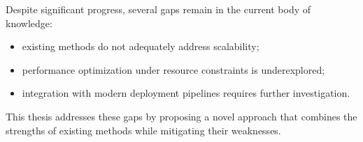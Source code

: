 Despite significant progress, several gaps remain in the current body of knowledge:
\begin{itemize}
  \item existing methods do not adequately address scalability;
  \item performance optimization under resource constraints is underexplored;
  \item integration with modern deployment pipelines requires further investigation.
\end{itemize}

This thesis addresses these gaps by proposing a novel approach that combines the strengths of existing methods while mitigating their weaknesses.

\clearpage
